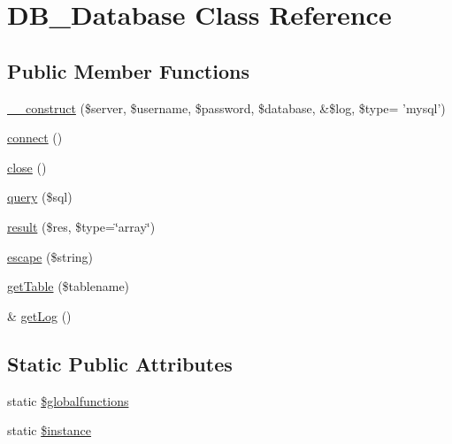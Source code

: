 \hypertarget{classDB__Database}{
\section{DB\_\-Database Class Reference}
\label{d3/d63/classDB__Database}
}
\subsection*{Public Member Functions}
\begin{DoxyCompactItemize}
\item 
\hyperlink{classDB__Database_aa7b0b5a7fa10d3928e1b95664662a9a2}{\_\-\_\-construct} (\$server, \$username, \$password, \$database, \&\$log, \$type= 'mysql')
\item 
\hyperlink{classDB__Database_a3312e7903885b871d21a18efbe558580}{connect} ()
\item 
\hyperlink{classDB__Database_ad8f40ab058e072bc074a9447eb8a7762}{close} ()
\item 
\hyperlink{classDB__Database_a67786f5c272e27980edf76a57fc16902}{query} (\$sql)
\item 
\hyperlink{classDB__Database_a2739adb306d170f19c0e87a61a2bfc05}{result} (\$res, \$type=\char`\"{}array\char`\"{})
\item 
\hyperlink{classDB__Database_af8c352a06f1cff03f2c782b9aa431b44}{escape} (\$string)
\item 
\hyperlink{classDB__Database_a3c1f6f79bdf1a2f2d019fd4fbf156819}{getTable} (\$tablename)
\item 
\& \hyperlink{classDB__Database_a98b8b2e954b888100ca2b6c00be811be}{getLog} ()
\end{DoxyCompactItemize}
\subsection*{Static Public Attributes}
\begin{DoxyCompactItemize}
\item 
static \hyperlink{classDB__Database_a79a31df0a3e64b5758441ce9bc2ffa70}{\$globalfunctions}
\item 
static \hyperlink{classDB__Database_a05ffbe581936d85f566ded58d8841b5b}{\$instance}
\end{DoxyCompactItemize}
